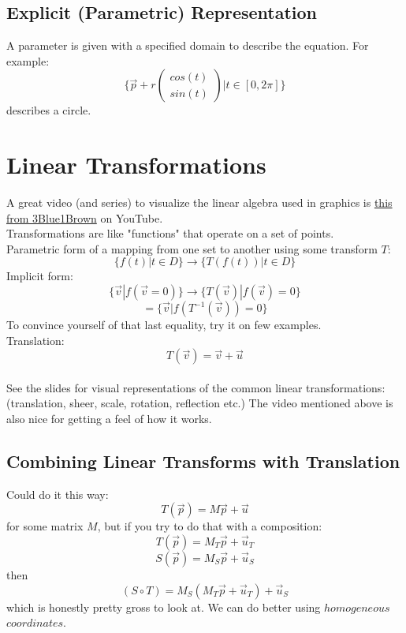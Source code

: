 \documentclass[12pt]{article}
\theoremstyle{definition}
\begin{document}
\subsection{Explicit (Parametric) Representation}
A parameter is given with a specified domain to describe the equation. For example: $$\{\vec{p} + r\begin{pmatrix}
cos(t) \\ sin(t)
\end{pmatrix} | t \in [0,2\pi]\}$$ describes a circle.
\section{Linear Transformations}
A great video (and series) to visualize the linear algebra used in graphics is \href{https://www.youtube.com/watch?v=kYB8IZa5AuE}{this from 3Blue1Brown} on YouTube.
\\ \linebreak 
Transformations are like "functions" that operate on a set of points. 
\\ \linebreak
Parametric form of a mapping from one set to another using some transform $T$:
$$ \{f(t) | t \in D\} \rightarrow \{T(f(t))|t \in D\}$$
Implicit form:
$$\{ \vec{v}| f(\vec{v} = 0)\} \rightarrow \{T(\vec{v})| f(\vec{v}) = 0\}$$
$$ = \{\vec{v} | f(T^{-1}(\vec{v})) = 0\}$$
To convince yourself of that last equality, try it on few examples.
\\ \linebreak
Translation: $$T(\vec{v}) = \vec{v} + \vec{u}$$
\\ \linebreak
See the slides for visual representations of the common linear transformations: (translation, sheer, scale, rotation, reflection etc.) The video mentioned above is also nice for getting a feel of how it works.
\subsection{Combining Linear Transforms with Translation}
Could do it this way:
$$T(\vec{p}) = M\vec{p} + \vec{u}$$
for some matrix $M$, but if you try to do that with a composition:
$$T(\vec{p}) = M_T\vec{p} + \vec{u}_T$$
$$S(\vec{p}) = M_S\vec{p} + \vec{u}_S$$
then
$$(S \circ T) = M_S(M_T\vec{p} + \vec{u}_T) +\vec{u}_S$$
which is honestly pretty gross to look at. We can do better using $homogeneous$ $coordinates$. 
\end{document}
